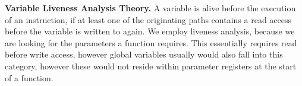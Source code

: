 \textbf{Variable Liveness Analysis Theory.}
\label{subsection:livenessanalysis}
A variable is alive before the execution of an instruction, if at least one of the originating paths contains a read access before the variable is written to again. We employ 
liveness analysis, because we are looking for the  parameters a function requires. This essentially requires read before write access, however global variables usually
would also fall into this category, however these would not reside within parameter registers at the start of a function.
%
%
%

    
